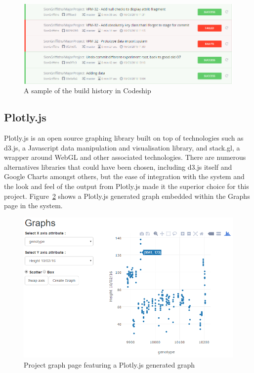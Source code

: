 \begin{figure}[H]
    \centering
    \includegraphics[width=\textwidth]{images/tools/codeShipSmall}
    \caption{A sample of the build history in Codeship}
    \label{fig:build_history}
\end{figure} 



\subsection{Plotly.js}

Plotly.js\cite{_plotly} is an open source graphing library built on top of technologies such as d3.js, a Javascript data manipulation and visualisation library, and stack.gl, a wrapper around WebGL and other associated technologies. There are numerous alternatives libraries that could have been chosen, including d3.js itself and Google Charts amongst others, but the ease of integration with the system and the look and feel of the output from Plotly.js made it the superior choice for this project. Figure~\ref{fig:plotly} shows a Plotly.js generated graph embedded within the Graphs page in the system.


\begin{figure}[H]
    \centering
    \includegraphics[width=\textwidth]{images/design/plotly}
    \caption{Project graph page featuring a Plotly.js generated graph}
    \label{fig:plotly}
\end{figure} 

